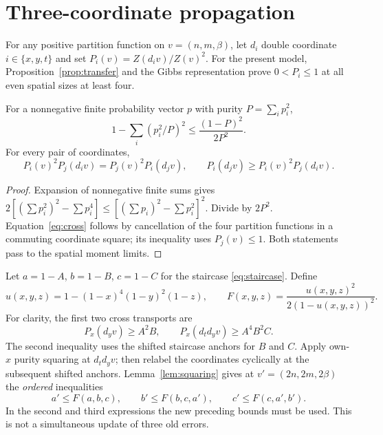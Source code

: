 \section{Three-coordinate propagation}\label{sec:purity}
For any positive partition function on $v=(n,m,\beta)$, let $d_i$ double
coordinate $i\in\{x,y,t\}$ and set $P_i(v)=Z(d_iv)/Z(v)^2$.
For the present model, Proposition~\ref{prop:transfer} and the Gibbs representation
prove $0<P_i\le1$ at all even spatial sizes at least four.

\begin{lemma}\label{lem:squaring}
For a nonnegative finite probability vector $p$ with purity $P=\sum_i p_i^2$,
\[
 1-\sum_i(p_i^2/P)^2\le\frac{(1-P)^2}{2P^2}.
\]
For every pair of coordinates,
\begin{equation}\label{eq:cross}
 P_i(v)^2P_j(d_iv)=P_j(v)^2P_i(d_jv),\qquad
 P_i(d_jv)\ge P_i(v)^2P_j(d_iv).
\end{equation}
\end{lemma}
\begin{proof}
Expansion of nonnegative finite sums gives
$2[(\sum p_i^2)^2-\sum p_i^4]\le[(\sum p_i)^2-\sum p_i^2]^2$.
Divide by $2P^2$. Equation~\eqref{eq:cross} follows by cancellation of the four
partition functions in a commuting coordinate square; its inequality uses
$P_j(v)\le1$. Both statements pass to the spatial moment limits.
\end{proof}

Let $a=1-A$, $b=1-B$, $c=1-C$ for the staircase \eqref{eq:staircase}.
Define
\begin{equation}\label{eq:F}
 u(x,y,z)=1-(1-x)^4(1-y)^2(1-z),\qquad
 F(x,y,z)=\frac{u(x,y,z)^2}{2(1-u(x,y,z))^2}.
\end{equation}
For clarity, the first two cross transports are
\[
 P_x(d_yv)\ge A^2B,\qquad
 P_x(d_t d_yv)\ge A^4B^2C.
\]
The second inequality uses the shifted staircase anchors for $B$ and $C$.
Apply own-$x$ purity squaring at $d_t d_yv$; then relabel the coordinates
cyclically at the subsequent shifted anchors. Lemma~\ref{lem:squaring} gives
at $v'=(2n,2m,2\beta)$ the \emph{ordered} inequalities
\begin{equation}\label{eq:ordered}
 a'\le F(a,b,c),\qquad b'\le F(b,c,a'),\qquad c'\le F(c,a',b').
\end{equation}
In the second and third expressions the new preceding bounds must be used.
This is not a simultaneous update of three old errors.

